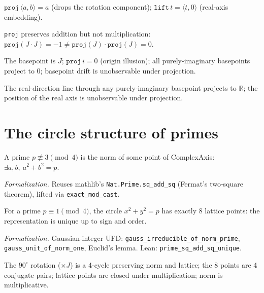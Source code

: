\documentclass[sigplan,10pt,anonymous,review]{acmart}
\begin{document}
\begin{definition}\label{def:proj}
$\texttt{proj}\,\langle a,b\rangle = a$ (drops the rotation component);
$\texttt{lift}\, t = \langle t, 0\rangle$ (real-axis embedding).
\end{definition}

\begin{lemma}\label{lem:projdrop}
\texttt{proj} preserves addition but not multiplication: $\texttt{proj}(J\cdot J) = -1
\neq \texttt{proj}(J)\cdot\texttt{proj}(J) = 0$.
\end{lemma}

\begin{lemma}\label{lem:drift}
The basepoint is $J$; $\texttt{proj}\, i = 0$ (origin illusion); all purely-imaginary
basepoints project to $0$; basepoint drift is unobservable under projection.
\end{lemma}

\begin{lemma}\label{lem:realclass}
The real-direction line through any purely-imaginary basepoint projects to $\mathbb{R}$;
the position of the real axis is unobservable under projection.
\end{lemma}

\section{The circle structure of primes}

\begin{theorem}\label{thm:twosq}
A prime $p \not\equiv 3 \pmod 4$ is the norm of some point of ComplexAxis:
$\exists a,b,\ a^2+b^2 = p$.
\end{theorem}
\emph{Formalization.} Reuses mathlib's \texttt{Nat.Prime.sq\_add\_sq} (Fermat's
two-square theorem), lifted via \texttt{exact\_mod\_cast}.

\begin{theorem}\label{thm:unique}
For a prime $p \equiv 1 \pmod 4$, the circle $x^2+y^2=p$ has exactly 8 lattice
points: the representation is unique up to sign and order.
\end{theorem}
\emph{Formalization.} Gaussian-integer UFD: \texttt{gauss\_irreducible\_of\_norm\_prime},
\texttt{gauss\_unit\_of\_norm\_one}, Euclid's lemma. Lean:
\texttt{prime\_sq\_add\_sq\_unique}.

\begin{theorem}\label{thm:orbit}
The $90^\circ$ rotation ($\times J$) is a 4-cycle preserving norm and lattice; the 8
points are 4 conjugate pairs; lattice points are closed under multiplication; norm is
multiplicative.
\end{theorem}
\end{document}

